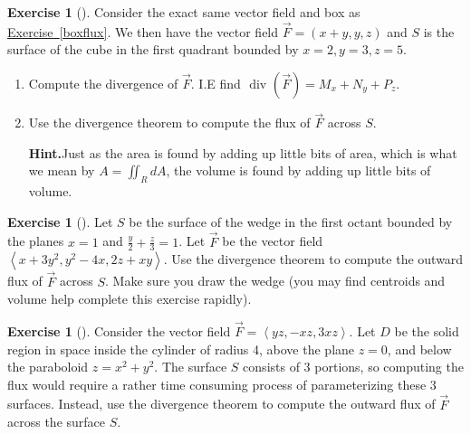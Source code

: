 \documentclass[10pt,]{book}
\theoremstyle{plain}
\theoremstyle{definition}
\theoremstyle{definition}
\theoremstyle{definition}
\theoremstyle{definition}
\newtheorem{exploration}[project]{Exercise}
\theoremstyle{definition}
\numberwithin{equation}{section}
\newcommand{\ds}{\displaystyle}
\newcommand{\lt}{<}
\begin{document}
\begin{exploration}[]\label{exploration-308}
Consider the exact same vector field and box as \hyperref[boxflux]{Exercise~\ref{boxflux}}. We then have the vector field \(\vec F=(x+y,y,z)\) and \(S\) is the surface of the cube in the first quadrant bounded by {\(x=2,y=3,z=5\)}.%
\begin{enumerate}[font=\bfseries,label=(\alph*),ref=\alph*]
\item\label{task-847} Compute the divergence of \(\vec F\). I.E find \(\text{ div } (\vec F) = M_x+N_y+P_z\).%
\item\label{task-848} Use the divergence theorem to compute the flux of \(\vec F\) across \(S\).%
\par\medskip\noindent%
\textbf{Hint.}\quad Just as the area is found by adding up little bits of area, which is what we mean by \(A=\iint_R dA\), the volume is found by adding up little bits of volume.%
\end{enumerate}
\end{exploration}
\begin{exploration}[]\label{exploration-309}
Let \(S\) be the surface of the wedge in the first octant bounded by the planes \(x=1\) and \(\ds\frac{y}{2}+\frac{z}{3}=1\). Let \(\vec F\) be the vector field \(\left\lt x+3y^2,y^2-4x,2z+xy\right>\). Use the divergence theorem to compute the outward flux of \(\vec F\) across \(S\). Make sure you draw the wedge (you may find centroids and volume help complete this exercise rapidly).%
\end{exploration}
\begin{exploration}[]\label{exploration-310}
Consider the vector field \(\vec F = \left\lt yz,-xz,3xz\right>\). Let \(D\) be the solid region in space inside the cylinder of radius 4, above the plane \(z=0\), and below the paraboloid \(z=x^2+y^2\). The surface \(S\) consists of 3 portions, so computing the flux would require a rather time consuming process of parameterizing these 3 surfaces. Instead, use the divergence theorem to compute the outward flux of \(\vec F\) across the surface \(S\).%
\end{exploration}
%
\backmatter
%
%
%
\end{document}
